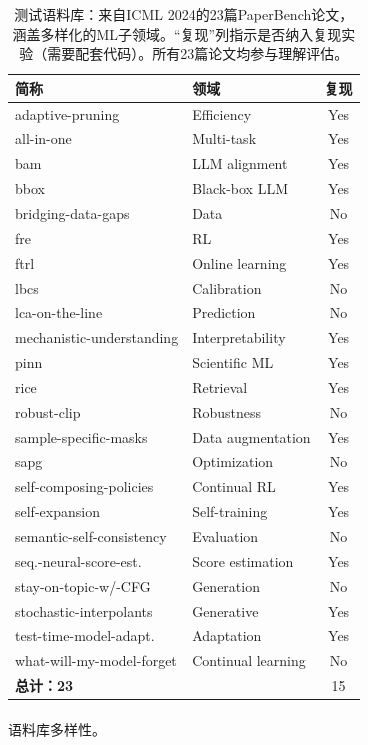 \documentclass[
]{article}
\makeatletter
\let\oldparagraph\paragraph
\renewcommand{\paragraph}{
    \@ifstar
      \xxxParagraphStar
      \xxxParagraphNoStar
  }
\newcommand{\xxxParagraphStar}[1]{\oldparagraph*{#1}\mbox{}}
\newcommand{\xxxParagraphNoStar}[1]{\oldparagraph{#1}\mbox{}}
\theoremstyle{definition}
\makeatother
\begin{document}
\begin{table}[htbp]
\centering
\small
\begin{tabular}{llc}
\toprule
\textbf{简称} & \textbf{领域} & \textbf{复现} \\
\midrule
adaptive-pruning & Efficiency & Yes \\
all-in-one & Multi-task & Yes \\
bam & LLM alignment & Yes \\
bbox & Black-box LLM & Yes \\
bridging-data-gaps & Data & No \\
fre & RL & Yes \\
ftrl & Online learning & Yes \\
lbcs & Calibration & No \\
lca-on-the-line & Prediction & No \\
mechanistic-understanding & Interpretability & Yes \\
pinn & Scientific ML & Yes \\
rice & Retrieval & Yes \\
robust-clip & Robustness & No \\
sample-specific-masks & Data augmentation & Yes \\
sapg & Optimization & No \\
self-composing-policies & Continual RL & Yes \\
self-expansion & Self-training & Yes \\
semantic-self-consistency & Evaluation & No \\
seq.-neural-score-est. & Score estimation & Yes \\
stay-on-topic-w/-CFG & Generation & No \\
stochastic-interpolants & Generative & Yes \\
test-time-model-adapt. & Adaptation & Yes \\
what-will-my-model-forget & Continual learning & No \\
\textbf{总计：23} &  & 15 \\
\bottomrule
\end{tabular}
\caption[PaperBench 测试语料库]{测试语料库：来自ICML 2024的23篇PaperBench论文，涵盖多样化的ML子领域。``复现''列指示是否纳入复现实验（需要配套代码）。所有23篇论文均参与理解评估。}
\label{tbl-corpus}
\end{table}

\paragraph{语料库多样性。}\label{ux8bedux6599ux5e93ux591aux6837ux6027}
\end{document}
